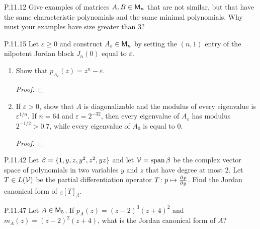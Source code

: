 \documentclass{../homework}
\begin{document}
\begin{problems}
\item[P.11.12] Give examples of matrices \(A, B \in \mathsf{M}_n\) that are
  not similar, but that have the same characteristic polynomials and
  the same minimal polynomials.  Why must your examples have size
  greater than 3?

  \begin{solution}

  \end{solution}

\item[P.11.15] Let \(\varepsilon \ge 0\) and construct
  \(A_\varepsilon \in \mathsf{M}_n\) by setting the \((n, 1)\) entry of the
  nilpotent Jordan block \(J_n(0)\) equal to \(\varepsilon\).
  \begin{enumerate}
  \item Show that \(p_{A_\varepsilon} (z) = z^n - \varepsilon\).

    \begin{solution}
      \begin{proof}

      \end{proof}
    \end{solution}

  \item If \(\varepsilon > 0\), show that \(A\) is diagonalizable and
    the modulus of every eigenvalue is \(\varepsilon^{1/n}\).  If
    \(n=64\) and \(\varepsilon = 2^{-32}\), then every eigenvalue of
    \(A_\varepsilon\) has modulus \(2^{-1/2} > 0.7\), while every
    eigenvalue of \(A_0\) is equal to \(0\).

    \begin{solution}
      \begin{proof}

      \end{proof}
    \end{solution}
  \end{enumerate}

\item[P.11.42] Let \(\beta = \{ {1, y, z, y^2, z^2, yz} \}\) and let
  \(\mathcal{V} = \operatorname*{span} \beta\) be the complex vector space of
  polynomials in two variables \(y\) and \(z\) that have degree at
  most \(2\).  Let \(T \in L(\mathcal{V})\) be the partial differentiation
  operator \(T \colon p \mapsto \frac{\mathop{}\! \partial^{} {p}}{\mathop{}\! \partial {y}^{}}\).  Find the Jordan canonical
  form of \(_\beta[T]_\beta\).

  \begin{solution}

  \end{solution}

\item[P.11.47] Let \(A \in \mathsf{M}_5\).  If \(p_A(z) = (z-2)^3 (z+4)^2\)
  and \(m_A(z) = (z-2)^2 (z+4)\), what is the Jordan canonical form of
  \(A\)?

  \begin{solution}

  \end{solution}
\end{problems}
\end{document}
